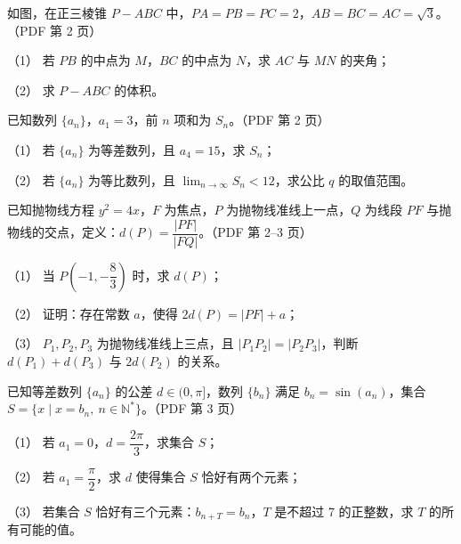 \Needspace{0.4\textheight}
\begin{question}
如图，在正三棱锥 $P-ABC$ 中，$PA=PB=PC=2$，$AB=BC=AC=\sqrt3$。（PDF 第 2 页）

（1） 若 $PB$ 的中点为 $M$，$BC$ 的中点为 $N$，求 $AC$ 与 $MN$ 的夹角；

（2） 求 $P-ABC$ 的体积。
\nopagebreak[4]
\begin{center}\end{center}
\nopagebreak[4]
\end{question}
\begin{question}
已知数列 $\{a_n\}$，$a_1=3$，前 $n$ 项和为 $S_n$。（PDF 第 2 页）

（1） 若 $\{a_n\}$ 为等差数列，且 $a_4=15$，求 $S_n$；

（2） 若 $\{a_n\}$ 为等比数列，且 $\displaystyle\lim_{n\to\infty}S_n<12$，求公比 $q$ 的取值范围。

\end{question}
\begin{question}
已知抛物线方程 $y^2=4x$，$F$ 为焦点，$P$ 为抛物线准线上一点，$Q$ 为线段 $PF$ 与抛物线的交点，定义：$d(P)=\dfrac{|PF|}{|FQ|}$。（PDF 第 2–3 页）

（1） 当 $P\left(-1,-\dfrac83\right)$ 时，求 $d(P)$；

（2） 证明：存在常数 $a$，使得 $2d(P)=|PF|+a$；

（3） $P_1,P_2,P_3$ 为抛物线准线上三点，且 $|P_1P_2|=|P_2P_3|$，判断 $d(P_1)+d(P_3)$ 与 $2d(P_2)$ 的关系。

\end{question}
\begin{question}
已知等差数列 $\{a_n\}$ 的公差 $d\in(0,\pi]$，数列 $\{b_n\}$ 满足 $b_n=\sin(a_n)$，集合 $S=\{x\mid x=b_n,\ n\in\mathbb N^*\}$。（PDF 第 3 页）

（1） 若 $a_1=0$，$d=\dfrac{2\pi}{3}$，求集合 $S$；

（2） 若 $a_1=\dfrac\pi2$，求 $d$ 使得集合 $S$ 恰好有两个元素；

（3） 若集合 $S$ 恰好有三个元素：$b_{n+T}=b_n$，$T$ 是不超过 7 的正整数，求 $T$ 的所有可能的值。

\end{question}
